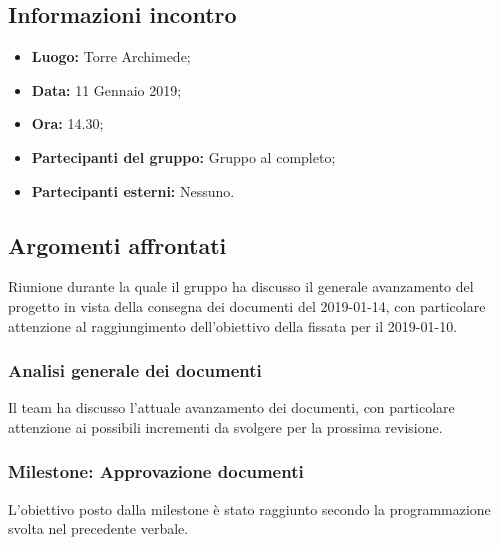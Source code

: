\subsection{Informazioni incontro}
\begin{itemize}
	\item { \textbf{Luogo:} Torre Archimede;  }
	\item { \textbf{Data:} 11 Gennaio 2019; }
	\item { \textbf{Ora:} 14.30; }
	\item { \textbf{Partecipanti del gruppo:} Gruppo al completo;}
	\item { \textbf{Partecipanti esterni:} Nessuno. }
\end{itemize}


\subsection{Argomenti affrontati}
Riunione durante la quale il gruppo ha discusso il generale avanzamento del progetto in vista della consegna dei documenti del 2019-01-14, con particolare attenzione al raggiungimento dell'obiettivo della  fissata per il 2019-01-10.

\subsubsection{Analisi generale dei documenti}
Il team ha discusso l'attuale avanzamento dei documenti, con particolare attenzione ai possibili incrementi da svolgere per la prossima revisione.
\subsubsection{Milestone: Approvazione documenti}
L'obiettivo posto dalla milestone è stato raggiunto secondo la programmazione svolta nel precedente verbale.